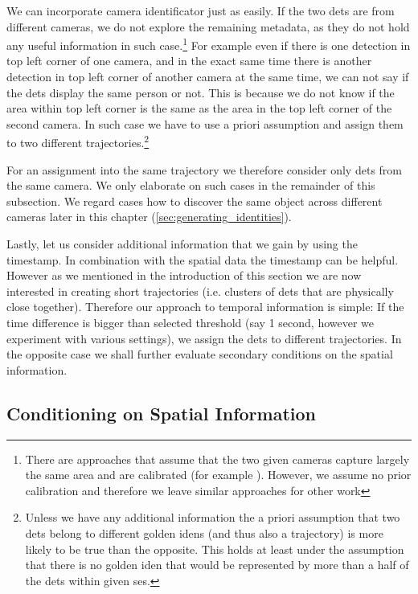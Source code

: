 We can incorporate camera identificator just as easily. If the two
\glspl{det} are from different cameras, we do not explore the remaining
metadata, as they do not hold any useful information in such
case.\footnote{There
are approaches that assume that the two given cameras capture largely the same
area and are calibrated (for example \cite{hu2006principal}). However, we
assume no prior calibration and therefore we leave similar approaches for other
work} For example even if there is one detection in top left corner of one
camera, and in the exact same time there is another detection in top left corner
of another camera at the same time, we can not say if the \glspl{det}
display the same person or not. This is
because we do not know if the area within top left corner is the same as the
area in the top left corner of the second camera. In such case we have to use
a priori assumption and assign them to two different
trajectories.\footnote{Unless we have any additional information the a priori
assumption that two \glspl{det} belong to different golden \glspl{iden} (and thus also a trajectory) is more
likely to be true than the opposite. This holds at least under the assumption that there is no
golden \gls{iden} that would be represented by more than a half of the
\glspl{det} within given \gls{ses}.}

For an assignment into the same trajectory we therefore consider only \glspl{det}
from the same camera. We only elaborate on such cases in the remainder
of this subsection. We regard cases how to discover the same object across
different cameras later in this chapter (\autoref{sec:generating_identities}).

Lastly, let us consider additional information that we gain by using the timestamp.
In combination with the spatial data the timestamp can be helpful. However as
we mentioned in the introduction of this section
we are now interested in creating short trajectories (i.e. clusters of
\glspl{det} that are physically close together). Therefore
our approach to temporal information is simple: If the time difference is
bigger than selected threshold (say 1 second, however we experiment with
various settings), we assign the \glspl{det} to different trajectories. In the
opposite case we shall further evaluate secondary conditions on the spatial
information.

\subsection{Conditioning on Spatial Information}

